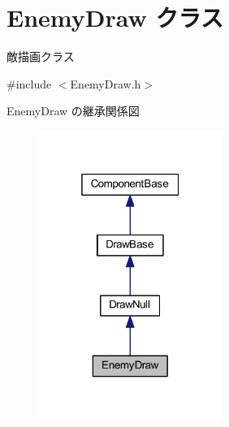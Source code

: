 \hypertarget{class_enemy_draw}{}\section{Enemy\+Draw クラス}
\label{class_enemy_draw}


敵描画クラス  




{\ttfamily \#include $<$Enemy\+Draw.\+h$>$}



Enemy\+Draw の継承関係図\nopagebreak
\begin{figure}[H]
\begin{center}
\leavevmode
\includegraphics[width=169pt]{class_enemy_draw__inherit__graph}
\end{center}
\end{figure}
